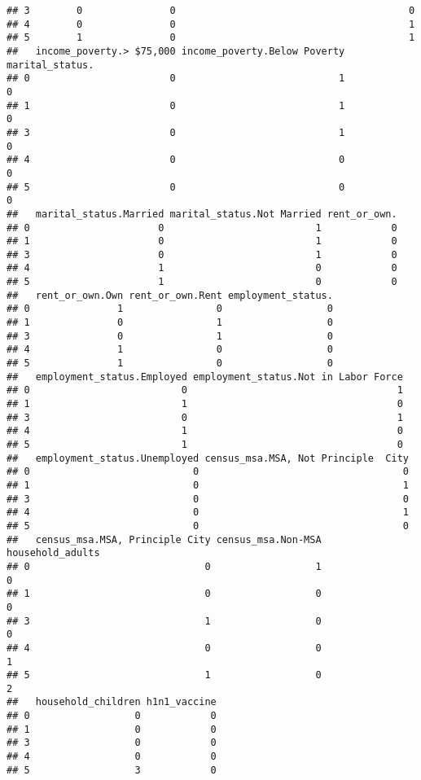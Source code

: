 \documentclass[
]{article}
\begin{document}
\begin{verbatim}
## 3        0               0                                        0
## 4        0               0                                        1
## 5        1               0                                        1
##   income_poverty.> $75,000 income_poverty.Below Poverty marital_status.
## 0                        0                            1               0
## 1                        0                            1               0
## 3                        0                            1               0
## 4                        0                            0               0
## 5                        0                            0               0
##   marital_status.Married marital_status.Not Married rent_or_own.
## 0                      0                          1            0
## 1                      0                          1            0
## 3                      0                          1            0
## 4                      1                          0            0
## 5                      1                          0            0
##   rent_or_own.Own rent_or_own.Rent employment_status.
## 0               1                0                  0
## 1               0                1                  0
## 3               0                1                  0
## 4               1                0                  0
## 5               1                0                  0
##   employment_status.Employed employment_status.Not in Labor Force
## 0                          0                                    1
## 1                          1                                    0
## 3                          0                                    1
## 4                          1                                    0
## 5                          1                                    0
##   employment_status.Unemployed census_msa.MSA, Not Principle  City
## 0                            0                                   0
## 1                            0                                   1
## 3                            0                                   0
## 4                            0                                   1
## 5                            0                                   0
##   census_msa.MSA, Principle City census_msa.Non-MSA household_adults
## 0                              0                  1                0
## 1                              0                  0                0
## 3                              1                  0                0
## 4                              0                  0                1
## 5                              1                  0                2
##   household_children h1n1_vaccine
## 0                  0            0
## 1                  0            0
## 3                  0            0
## 4                  0            0
## 5                  3            0
\end{verbatim}
\end{document}
